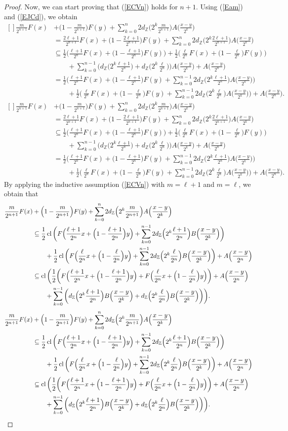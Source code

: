 \documentclass[12pt,reqno]{amsart}
\newcommand{\Z}{\mathbb{Z}}
\newcommand{\cl}{\mathop{\hbox{\rm cl}}\nolimits}
\theoremstyle{definition}
\def\eq#1{{\rm(\ref{E#1})}}
\def\Eq#1#2{\ifthenelse{\equal{#1}{*}}
  {\begin{equation*}\begin{aligned}[]#2\end{aligned}\end{equation*}}
  {\begin{equation}\begin{aligned}[]\label{E#1}#2\end{aligned}\end{equation}}}
\begin{document}
\begin{proof}
Now, we can start proving that \eq{CVn} holds for $n+1$. Using \eq{am} and \eq{JCd}, we obtain
\Eq{*}{
  \frac{m}{2^{n+1}}F(x)&+\Big(1-\frac{m}{2^{n+1}}\Big)F(y)
   + \sum_{k=0}^{n}2 d_{\Z}\Big(2^k \frac{m}{2^{n+1}}\Big)A\Big(\frac{x-y}{2^k}\Big) \\
  &= \frac{2\ell+1}{2^{n+1}}F(x)+\Big(1-\frac{2\ell+1}{2^{n+1}}\Big)F(y)
   + \sum_{k=0}^{n}2 d_{\Z}\Big(2^k \frac{2\ell+1}{2^{n+1}}\Big)A\Big(\frac{x-y}{2^k}\Big) \\
  &\subseteq \frac12\Big(\frac{\ell+1}{2^{n}}F(x)+\Big(1-\frac{\ell+1}{2^{n}}\Big)F(y)\Big) 
     +\frac12\Big(\frac{\ell}{2^{n}}F(x)+\Big(1-\frac{\ell}{2^{n}}\Big)F(y)\Big)\\
  &\qquad+\sum_{k=0}^{n-1}\Big(d_\Z\Big(2^k\frac{\ell+1}{2^{n}}\Big)+d_\Z\Big(2^k\frac{\ell}{2^{n}}\Big)\Big)
             A\Big(\frac{x-y}{2^k}\Big) + A\Big(\frac{x-y}{2^n}\Big) \\
  &= \frac12\Big(\frac{\ell+1}{2^{n}}F(x)+\Big(1-\frac{\ell+1}{2^{n}}\Big)F(y)
     +\sum_{k=0}^{n-1}2 d_\Z\Big(2^k\frac{\ell+1}{2^{n}}\Big)A\Big(\frac{x-y}{2^k}\Big)\Big)\\
  &\qquad +\frac12\Big(\frac{\ell}{2^{n}}F(x)+\Big(1-\frac{\ell}{2^{n}}\Big)F(y)
   + \sum_{k=0}^{n-1}2d_\Z\Big(2^k\frac{\ell}{2^{n}}\Big)A\Big(\frac{x-y}{2^k}\Big)\Big)
   + A\Big(\frac{x-y}{2^n}\Big). 
}
By applying the inductive assumption \eq{CVn} with $m=\ell+1$ and $m=\ell$, we obtain that
\Eq{JCVa}{
  \frac{m}{2^{n+1}}F(x)&+\Big(1-\frac{m}{2^{n+1}}\Big)F(y)
   + \sum_{k=0}^{n}2 d_{\Z}\Big(2^k \frac{m}{2^{n+1}}\Big)A\Big(\frac{x-y}{2^k}\Big) \\
 &\subseteq \frac12\cl\bigg(F\Big(\frac{\ell+1}{2^{n}}x+\Big(1-\frac{\ell+1}{2^{n}}\Big)y\Big)
     +\sum_{k=0}^{n-1} 2d_\Z\Big(2^k\frac{\ell+1}{2^{n}}\Big)B\Big(\frac{x-y}{2^k}\Big)\bigg)\\
   &\qquad+\frac12\cl\bigg(F\Big(\frac{\ell}{2^{n}}x+\Big(1-\frac{\ell}{2^{n}}\Big)y\Big)
   + \sum_{k=0}^{n-1} 2d_\Z\Big(2^k\frac{\ell}{2^{n}}\Big)B\Big(\frac{x-y}{2^k}\Big)\bigg) 
      + A\Big(\frac{x-y}{2^n}\Big)\\
 &\subseteq \cl\bigg(\frac12\bigg(F\Big(\frac{\ell+1}{2^{n}}x+\Big(1-\frac{\ell+1}{2^{n}}\Big)y\Big)
     +F\Big(\frac{\ell}{2^{n}}x+\Big(1-\frac{\ell}{2^{n}}\Big)y\Big)\bigg)
     +A\Big(\frac{x-y}{2^n}\Big) \\
   &\qquad+ \sum_{k=0}^{n-1}\bigg(d_\Z\Big(2^k\frac{\ell+1}{2^{n}}\Big)B\Big(\frac{x-y}{2^k}\Big)
      +d_\Z\Big(2^k\frac{\ell}{2^{n}}\Big) B\Big(\frac{x-y}{2^k}\Big)\bigg)\bigg). \\
}
\end{proof}
\end{document}
